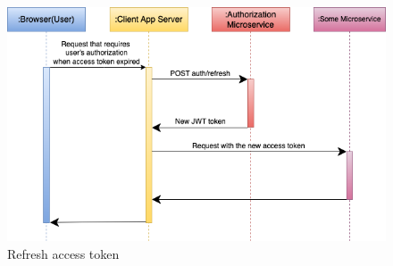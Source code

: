 \begin{figure}[hp]
\centering
\includegraphics[scale=0.6]{../png/refresh_token.png}
\caption{Refresh access token}
\end{figure}


